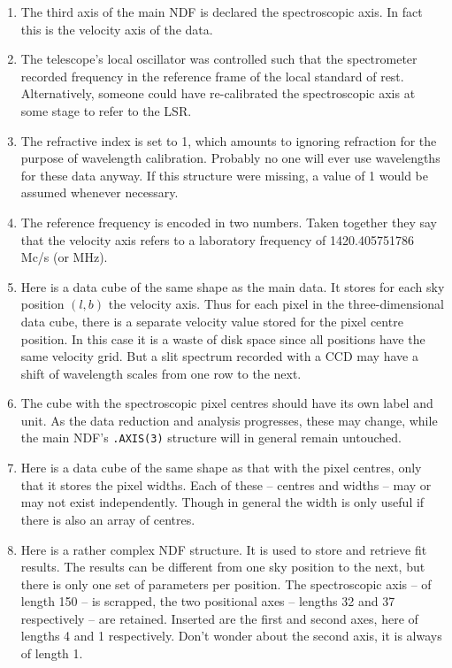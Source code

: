 \begin{enumerate}
\item The third axis of the main NDF is declared the spectroscopic axis. In
fact this is the velocity axis of the data.

\item The telescope's local oscillator was controlled such that the
spectrometer recorded frequency in the reference frame of the local standard of
rest. Alternatively, someone could have re-calibrated the spectroscopic axis at
some stage to refer to the LSR.

\item The refractive index is set to 1, which amounts to ignoring refraction
for the purpose of wavelength calibration. Probably no one will ever use
wavelengths for these data anyway. If this structure were missing, a value of 1
would be assumed whenever necessary.

\item The reference frequency is encoded in two numbers. Taken together they
say that the velocity axis refers to a laboratory frequency of 1420.405751786
Mc/s (or MHz).

\item Here is a data cube of the same shape as the main data. It stores for
each sky position $(l,b)$ the velocity axis. Thus for each pixel in the
three-dimensional data cube, there is a separate velocity value stored for the
pixel centre position. In this case it is a waste of disk space since all
positions have the same velocity grid. But a slit spectrum recorded with a CCD
may have a shift of wavelength scales from one row to the next.

\item The cube with the spectroscopic pixel centres should have its own label
and unit. As the data reduction and analysis progresses, these may change,
while the main NDF's {\tt .AXIS(3)} structure will in general remain untouched.

\item Here is a data cube of the same shape as that with the pixel centres,
only that it stores the pixel widths. Each of these -- centres and widths --
may or may not exist independently. Though in general the width is only useful
if there is also an array of centres.

\item Here is a rather complex NDF structure. It is used to store and retrieve
fit results. The results can be different from one sky position to the next,
but there is only one set of parameters per position. The spectroscopic axis --
of length 150 -- is scrapped, the two positional axes -- lengths 32 and 37
respectively -- are retained. Inserted are the first and second axes, here of
lengths 4 and 1 respectively. Don't wonder about the second axis, it is always
of length 1.


\end{enumerate}
